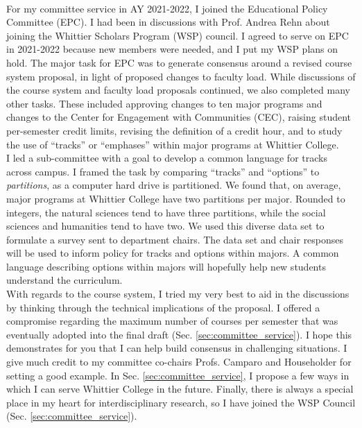 \documentclass[../../main.tex]{subfiles}
\begin{document}
\\
\vspace{0.15cm}
For my committee service in AY 2021-2022, I joined the Educational Policy Committee (EPC).  I had been in discussions with Prof. Andrea Rehn about joining the Whittier Scholars Program (WSP) council.  I agreed to serve on EPC in 2021-2022 because new members were needed, and I put my WSP plans on hold.  The major task for EPC was to generate consensus around a revised course system proposal, in light of proposed changes to faculty load.  While discussions of the course system and faculty load proposals continued, we also completed many other tasks.  These included approving changes to ten major programs and changes to the Center for Engagement with Communities (CEC), raising student per-semester credit limits, revising the definition of a credit hour, and to study the use of ``tracks'' or ``emphases'' within major programs at Whittier College.
\\
\vspace{0.15cm}
I led a sub-committee with a goal to develop a common language for tracks across campus.  I framed the task by comparing ``tracks'' and ``options'' to \textit{partitions}, as a computer hard drive is partitioned.  We found that, on average, major programs at Whittier College have two partitions per major. Rounded to integers, the natural sciences tend to have three partitions, while the social sciences and humanities tend to have two.  We used this diverse data set to formulate a survey sent to department chairs.  The data set and chair responses will be used to inform policy for tracks and options within majors.  A common language describing options within majors will hopefully help new students understand the curriculum.
\\
\vspace{0.15cm}
With regards to the course system, I tried my very best to aid in the discussions by thinking through the technical implications of the proposal.  I offered a compromise regarding the maximum number of courses per semester that was eventually adopted into the final draft (Sec. \ref{sec:committee_service}).  I hope this demonstrates for you that I can help build consensus in challenging situations.  I give much credit to my committee co-chairs Profs. Camparo and Householder for setting a good example.  In Sec. \ref{sec:committee_service}, I propose a few ways in which I can serve Whittier College in the future.  Finally, there is always a special place in my heart for interdisciplinary research, so I have joined the WSP Council (Sec. \ref{sec:committee_service}).
\end{document}
